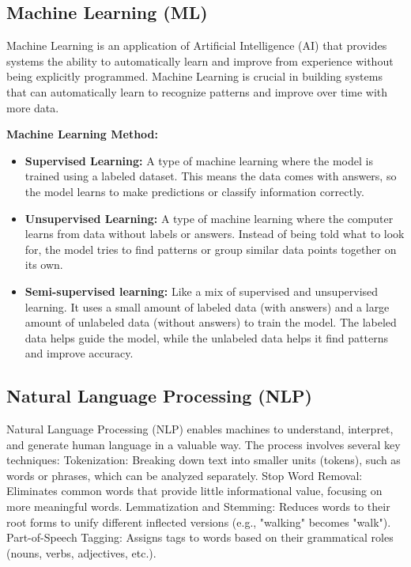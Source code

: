 \documentclass[12pt,oneside,openright,a4paper]{cpe-english-project}
\begin{document}
\subsection{Machine Learning (ML)}
Machine Learning is an application of Artificial Intelligence (AI) that provides systems the ability to automatically learn and improve from experience without being explicitly programmed. Machine Learning is crucial in building systems that can automatically learn to recognize patterns and improve over time with more data.

\textbf{Machine Learning Method:}
\begin{itemize}
    \item \textbf{Supervised Learning:} A type of machine learning where the model is trained using a labeled dataset. This means the data comes with answers, so the model learns to make predictions or classify information correctly.
 
    \item \textbf{Unsupervised Learning:} A type of machine learning where the computer learns from data without labels or answers. Instead of being told what to look for, the model tries to find patterns or group similar data points together on its own.
    
    \item \textbf{Semi-supervised learning:} Like a mix of supervised and unsupervised learning. It uses a small amount of labeled data (with answers) and a large amount of unlabeled data (without answers) to train the model. The labeled data helps guide the model, while the unlabeled data helps it find patterns and improve accuracy.
\end{itemize}



\subsection{Natural Language Processing (NLP)} Natural Language Processing (NLP) enables machines to understand, interpret, and generate human language in a valuable way. The process involves several key techniques: Tokenization: Breaking down text into smaller units (tokens), such as words or phrases, which can be analyzed separately. Stop Word Removal: Eliminates common words that provide little informational value, focusing on more meaningful words. Lemmatization and Stemming: Reduces words to their root forms to unify different inflected versions (e.g., "walking" becomes "walk"). Part-of-Speech Tagging: Assigns tags to words based on their grammatical roles (nouns, verbs, adjectives, etc.).
\end{document}
